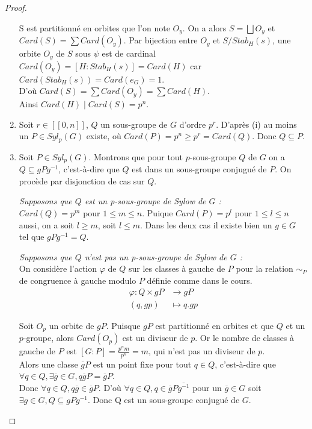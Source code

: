 \documentclass[french]{article}
\theoremstyle{definition}
\theoremstyle{plain}
\theoremstyle{plain}
\theoremstyle{plain}
\theoremstyle{plain}
\theoremstyle{plain}
\begin{document}
\begin{proof}
\begin{enumerate}[label={\upshape(\roman*)}]
S est partitionné en orbites que l'on note \( O_y \). On a alors \( S = \bigsqcup O_{y} \) et 
\( Card(S) = \sum Card(O_{y}) \).
Par bijection entre \( O_y \) et \( S/Stab_H(s) \), une orbite \( O_y \) de \( S \) sous \( \psi \) est de cardinal \( Card(O_y) = [H : Stab_{H}({s}) ] = Card(H) \) car \( Card(Stab_{H}({s})) = Card(e_{G}) = 1 \). \\
D'où \( Card(S) = \sum Card(O_{y}) = \sum Card(H) \). \\
Ainsi \( Card(H) \mid Card(S) = p^{n} \).

\item Soit \( r \in [\![0,n]\!] \), \( Q \) un sous-groupe de \( G \) d'ordre \( p^{r} \). 
D'après (i) au moins un \( P \in Syl_p(G) \) existe, où \( Card(P) = p^{n} \geq p ^{r} = Card(Q) \).
Donc \( Q \subseteq P \).

\item Soit \( P \in Syl_{p}({G}) \). Montrons que pour tout \(p\)-sous-groupe \( Q \) de \( G \) on a \( Q \subseteq gPg^{-1} \), c'est-à-dire que \( Q \) est dans un sous-groupe conjugué de \( P \). On procède par disjonction de cas sur \( Q \).
	\par \textit{Supposons que \( Q \) est un p-sous-groupe de Sylow de \( G \) :}\\
	\( Card(Q) = p^{m}\) pour \( 1 \le m \le n \). Puique \( Card(P) = p^{l}\) pour 
	\( 1 \le l \le n \) aussi, on a soit \( l \ge m \), soit \( l \le m \). Dans les 
	deux cas il existe bien un \( g \in G \) tel que \( gPg^{-1} = Q \).
	
	\par \textit{Supposons que \( Q \) n'est pas un p-sous-groupe de Sylow de \( G \) :}\\ On considère l'action \( \varphi \) de \( Q \) sur les classes à gauche de \( P \) pour la relation \( \sim_{P} \) de congruence à gauche modulo \( P \) définie comme dans le cours. 
\begin{align*}
	\varphi : Q \times gP &\to gP \\
	(q,gp) &\mapsto q.gp
\end{align*}

Soit \( O_{p} \) un orbite de \( gP \). Puisque \( gP \) est partitionné en orbites et que \( Q \) et un \(p\)-groupe, alors \( Card(O_{p}) \) est un diviseur de \( p \). Or le nombre de classes à gauche de \( P \) est \([G : P] = \frac{p^{n}m}{p^{n}} = m  \), qui n'est pas un diviseur de \( p \). \\
Alors une classe \( \overline{g}P \) est un point fixe pour tout \( q \in Q \), c'est-à-dire que \( \forall q \in Q, \exists \overline{g} \in G, q\overline{g}P = \overline{g}P \). \\
Donc \( \forall q \in Q, q\overline{g} \in \overline{g}P \). D'où \( \forall q \in Q, q \in \overline{g}P\overline{g^{-1}} \) pour un \( \overline{g} \in G \) soit \(\exists g \in G, Q \subseteq gPg^{-1} \). Donc Q est un sous-groupe conjugué de \( G \).


\end{enumerate}
\end{proof}
\end{document}
